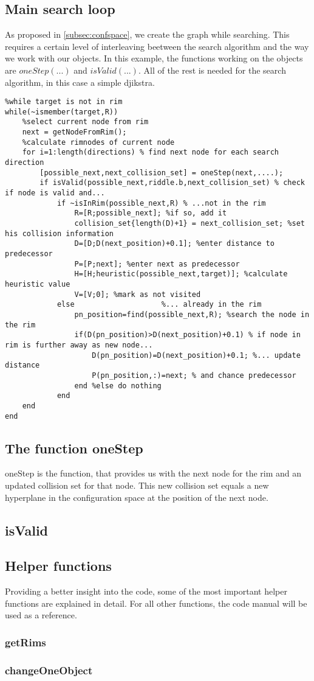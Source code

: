 \subsection{Main search loop}
As proposed in \ref{subsec:confspace}, we create the graph while searching. This requires a certain level of interleaving beetween the search algorithm and the way we work with our objects. In this example, the functions working on the objects are $oneStep(...)$ and $isValid(...)$. All of the rest is needed for the search algorithm, in this case a simple djikstra.
\lstset{language=Matlab}
\begin{lstlisting}
%while target is not in rim
while(~ismember(target,R))
    %select current node from rim
    next = getNodeFromRim();  
    %calculate rimnodes of current node 
    for i=1:length(directions) % find next node for each search direction
        [possible_next,next_collision_set] = oneStep(next,....); 
        if isValid(possible_next,riddle.b,next_collision_set) % check if node is valid and...
            if ~isInRim(possible_next,R) % ...not in the rim
                R=[R;possible_next]; %if so, add it
                collision_set{length(D)+1} = next_collision_set; %set his collision information
                D=[D;D(next_position)+0.1]; %enter distance to predecessor
                P=[P;next]; %enter next as predecessor
                H=[H;heuristic(possible_next,target)]; %calculate heuristic value
                V=[V;0]; %mark as not visited
            else                    %... already in the rim
                pn_position=find(possible_next,R); %search the node in the rim
                if(D(pn_position)>D(next_position)+0.1) % if node in rim is further away as new node...
                    D(pn_position)=D(next_position)+0.1; %... update distance
                    P(pn_position,:)=next; % and chance predecessor
                end %else do nothing
            end
    end  
end
\end{lstlisting}

\subsection{The function oneStep}
oneStep is the function, that provides us with the next node for the rim and an updated collision set for that node. This new collision set equals a new hyperplane in the configuration space at the position of the next node.

\subsection{isValid}
\subsection{Helper functions}
Providing a better insight into the code, some of the most important helper functions are explained in detail. For all other functions, the code manual will be used as a reference.
\subsubsection{getRims}
\subsubsection{changeOneObject}
